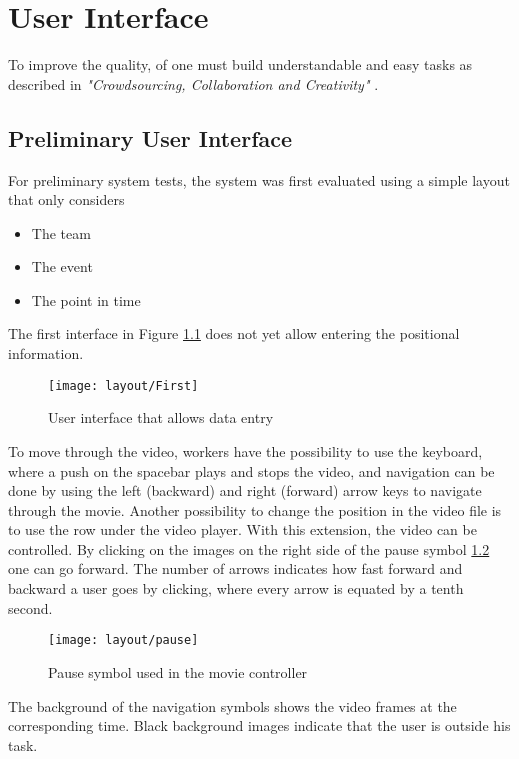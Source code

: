 \chapter{User Interface}

To improve the quality, of one must build understandable and easy tasks as described in \textit{"Crowdsourcing, Collaboration and Creativity"} \cite{Kittur:2010}.

\section{Preliminary User Interface}\label{sec:FirstLayout}

For preliminary system tests, the system was first evaluated using a simple layout that only considers
\begin{itemize}
    \item The team
    \item The event
    \item The point in time
\end{itemize}

The first interface in Figure \ref{img:Layout1a} does not yet allow entering the positional information.

\begin{figure}[H]
    \centering
    \texttt{[image: layout/First]}
    \caption{User interface that allows data entry}
    \label{img:Layout1a}
\end{figure}

To move through the video, workers have the possibility to use the keyboard, where a push on the spacebar plays and stops the video, and navigation can be done by using the left (backward) and right (forward) arrow keys to navigate through the movie.
Another possibility to change the position in the video file is to use the row under the video player. With this extension, the video can be controlled. By clicking on the images on the right side of the pause symbol \ref{img:pause} one can go forward. The number of arrows indicates how fast forward and backward a user goes by clicking, where every arrow is equated by a tenth second.


\begin{figure}[H]
    \centering
    \texttt{[image: layout/pause]}
    \caption{Pause symbol used in the movie controller}
    \label{img:pause}
\end{figure}

The background of the navigation symbols shows the video frames at the corresponding time. Black background images indicate that the user is outside his task.

